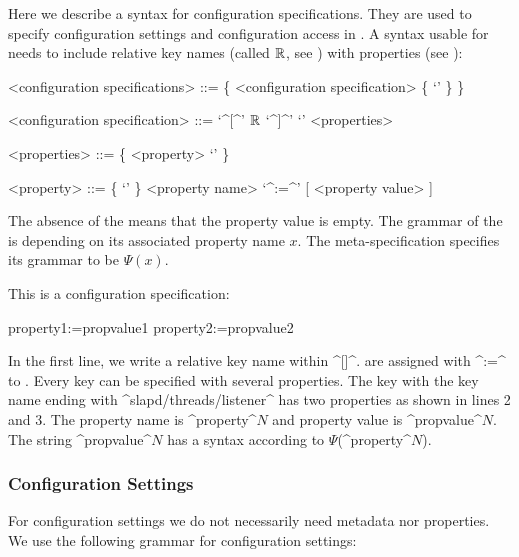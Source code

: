 Here we describe a syntax for configuration specifications.
They are used to specify configuration settings and configuration access in .
A syntax usable for  needs to include relative key names (called $\mathbb{R}$, see ) with properties (see ):

\begin{grammar}
<configuration specifications> ::= \{ <configuration specification>  \{ \lq\LineBreak' \} \}

<configuration specification> ::= \lq^[^' $\mathbb{R}$ \lq^]^' \lq\LineBreak' <properties>

<properties> ::= \{ <property> \lq\LineBreak' \}

<property> ::= \{  \lq\WhiteSpace' \}  <property name> \lq^:=^' [ <property value> ]
\end{grammar}

The absence of the  means that the property value is empty.
The grammar of the  is depending on its associated property name $x$.
The meta-specification specifies its grammar to be $\Psi(x)$.

\begin{example}
This is a configuration specification:

\begin{code}
  property1:=propvalue1
  property2:=propvalue2
\end{code}

In the first line, we write a relative key name within ^[]^.
 are assigned with ^:=^ to .
Every key can be specified with several properties.
The key with the key name ending with ^slapd/threads/listener^ has two properties as shown in lines 2 and 3.
The property name is ^property^$N$ and property value is ^propvalue^$N$.
The string ^propvalue^$N$ has a syntax according to $\Psi$(^property^$N$).
\end{example}




\subsubsection{Configuration Settings}
\label{sec:syntax-settings}

For configuration settings we do not necessarily need metadata nor properties.
We use the following grammar for configuration settings:

